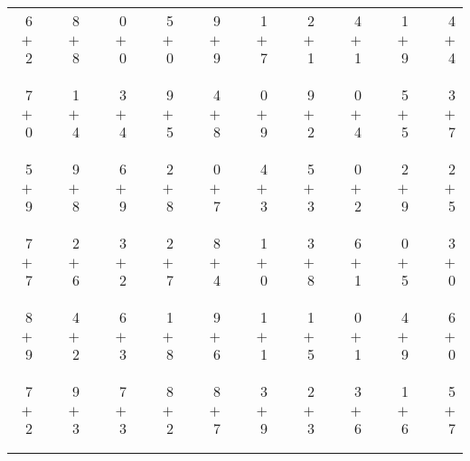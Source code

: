 \documentclass[12pt, letterpaper]{article}
\begin{document}
\begin{tabular}{rrrrrrrrrrrrrrrrrrr}
6 & & 8 & & 0 & & 5 & & 9 & & 1 & & 2 & & 4 & & 1 & & 4\\
$+$ 2 & & $+$ 8 & & $+$ 0 & & $+$ 0 & & $+$ 9 & & $+$ 7 & & $+$ 1 & & $+$ 1 & & $+$ 9 & & $+$ 4\\
\cline{1-1} \cline{3-3} \cline{5-5} \cline{7-7} \cline{9-9} \cline{11-11} \cline{13-13} \cline{15-15} \cline{17-17} \cline{19-19} \\ \\
7 & & 1 & & 3 & & 9 & & 4 & & 0 & & 9 & & 0 & & 5 & & 3\\
$+$ 0 & & $+$ 4 & & $+$ 4 & & $+$ 5 & & $+$ 8 & & $+$ 9 & & $+$ 2 & & $+$ 4 & & $+$ 5 & & $+$ 7\\
\cline{1-1} \cline{3-3} \cline{5-5} \cline{7-7} \cline{9-9} \cline{11-11} \cline{13-13} \cline{15-15} \cline{17-17} \cline{19-19} \\ \\
5 & & 9 & & 6 & & 2 & & 0 & & 4 & & 5 & & 0 & & 2 & & 2\\
$+$ 9 & & $+$ 8 & & $+$ 9 & & $+$ 8 & & $+$ 7 & & $+$ 3 & & $+$ 3 & & $+$ 2 & & $+$ 9 & & $+$ 5\\
\cline{1-1} \cline{3-3} \cline{5-5} \cline{7-7} \cline{9-9} \cline{11-11} \cline{13-13} \cline{15-15} \cline{17-17} \cline{19-19} \\ \\
7 & & 2 & & 3 & & 2 & & 8 & & 1 & & 3 & & 6 & & 0 & & 3\\
$+$ 7 & & $+$ 6 & & $+$ 2 & & $+$ 7 & & $+$ 4 & & $+$ 0 & & $+$ 8 & & $+$ 1 & & $+$ 5 & & $+$ 0\\
\cline{1-1} \cline{3-3} \cline{5-5} \cline{7-7} \cline{9-9} \cline{11-11} \cline{13-13} \cline{15-15} \cline{17-17} \cline{19-19} \\ \\
8 & & 4 & & 6 & & 1 & & 9 & & 1 & & 1 & & 0 & & 4 & & 6\\
$+$ 9 & & $+$ 2 & & $+$ 3 & & $+$ 8 & & $+$ 6 & & $+$ 1 & & $+$ 5 & & $+$ 1 & & $+$ 9 & & $+$ 0\\
\cline{1-1} \cline{3-3} \cline{5-5} \cline{7-7} \cline{9-9} \cline{11-11} \cline{13-13} \cline{15-15} \cline{17-17} \cline{19-19} \\ \\
7 & & 9 & & 7 & & 8 & & 8 & & 3 & & 2 & & 3 & & 1 & & 5\\
$+$ 2 & & $+$ 3 & & $+$ 3 & & $+$ 2 & & $+$ 7 & & $+$ 9 & & $+$ 3 & & $+$ 6 & & $+$ 6 & & $+$ 7\\
\cline{1-1} \cline{3-3} \cline{5-5} \cline{7-7} \cline{9-9} \cline{11-11} \cline{13-13} \cline{15-15} \cline{17-17} \cline{19-19} \\ \\

\end{tabular}
\end{document}
